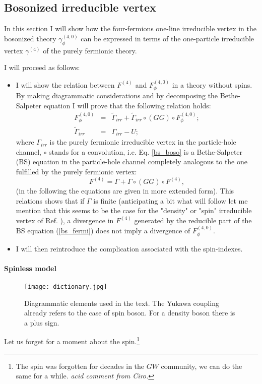 \documentclass[a4paper,11pt]{article}
\begin{document}
\subsection{ Bosonized irreducible vertex} 

In this section I will show how the four-fermions one-line irreducible vertex  in the bosonized theory $\gamma^{(4,0)}_\phi$ can be expressed in terms of the one-particle irreducible vertex $\gamma^{(4)}$ of the purely fermionic theory.

I will proceed as follows: 
\begin{itemize} 
\item I will show the relation between $F^{(4)}$ and $F_\phi^{(4,0)}$ in a theory without spins. 
By making diagrammatic considerations and by decomposing the Bethe-Salpeter equation I will prove that the following relation holds: 
\begin{eqnarray}
\label{bs_boso}
F_\phi^{(4,0)}&=&\tilde\Gamma_{irr}
+\tilde \Gamma_{irr}  \circ (GG) \circ F_\phi^{(4,0)};
\\ 
\tilde \Gamma_{irr} & = &\Gamma_{irr} - U; 
\end{eqnarray}
where $\Gamma_{irr}$ is the purely fermionic irreducible vertex in the particle-hole channel\cite{Rohringer2012},  $\circ$ stands for a convolution, i.e. Eq. \ref{bs_boso} is a Bethe-Salpeter (BS) equation in the particle-hole channel completely analogous to the one fulfilled by the purely fermionic vertex: 
\begin{equation} 
\label{bs_fermi} 
F^{(4)}=\Gamma
+\Gamma \circ (GG) \circ F^{(4)}, 
\end{equation} 
(in the following the equations are given in more extended form). 
This relations shows that if $\Gamma$ is finite (anticipating a bit what will follow let me mention that this seems to be the case for the "density" or "spin" irreducible vertex of Ref.  \cite{Schafer2013}), a divergence in $F^{(4)}$ generated by the reducible part of the BS equation (\ref{bs_fermi}) does not imply a divergence of $F_\phi^{(4,0)}$.  
\item I will then reintroduce the complication associated with the spin-indexes. 
\end{itemize}
\paragraph{Spinless model} 

\begin{figure}
\texttt{[image: dictionary.jpg]}
\label{dictionary}
\caption{Diagrammatic elements used in the text. The Yukawa coupling already refers to the case of spin boson. For a density boson there is a plus sign. } 
\end{figure}
Let us forget for a moment about the spin.\footnote{The spin was forgotten for decades in the $GW$ community, we can do the same for a while. {\sl acid comment from Ciro.}} 
\end{document}
